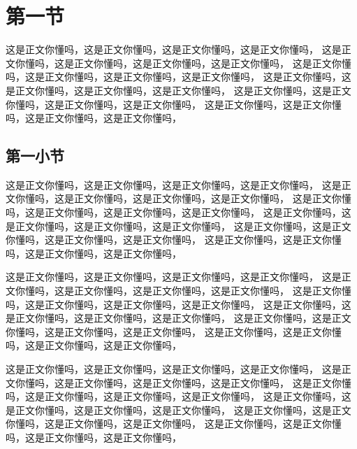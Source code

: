 \documentclass[11pt,a4paper]{article}
\begin{document}
\section{第一节}

这是正文你懂吗，这是正文你懂吗，这是正文你懂吗，这是正文你懂吗，
这是正文你懂吗，这是正文你懂吗，这是正文你懂吗，这是正文你懂吗，
这是正文你懂吗，这是正文你懂吗，这是正文你懂吗，这是正文你懂吗，
这是正文你懂吗，这是正文你懂吗，这是正文你懂吗，这是正文你懂吗，
这是正文你懂吗，这是正文你懂吗，这是正文你懂吗，这是正文你懂吗，
这是正文你懂吗，这是正文你懂吗，这是正文你懂吗，这是正文你懂吗，

\subsection{第一小节}

这是正文你懂吗，这是正文你懂吗，这是正文你懂吗，这是正文你懂吗，
这是正文你懂吗，这是正文你懂吗，这是正文你懂吗，这是正文你懂吗，
这是正文你懂吗，这是正文你懂吗，这是正文你懂吗，这是正文你懂吗，
这是正文你懂吗，这是正文你懂吗，这是正文你懂吗，这是正文你懂吗，
这是正文你懂吗，这是正文你懂吗，这是正文你懂吗，这是正文你懂吗，
这是正文你懂吗，这是正文你懂吗，这是正文你懂吗，这是正文你懂吗，

这是正文你懂吗，这是正文你懂吗，这是正文你懂吗，这是正文你懂吗，
这是正文你懂吗，这是正文你懂吗，这是正文你懂吗，这是正文你懂吗，
这是正文你懂吗，这是正文你懂吗，这是正文你懂吗，这是正文你懂吗，
这是正文你懂吗，这是正文你懂吗，这是正文你懂吗，这是正文你懂吗，
这是正文你懂吗，这是正文你懂吗，这是正文你懂吗，这是正文你懂吗，
这是正文你懂吗，这是正文你懂吗，这是正文你懂吗，这是正文你懂吗，

这是正文你懂吗，这是正文你懂吗，这是正文你懂吗，这是正文你懂吗，
这是正文你懂吗，这是正文你懂吗，这是正文你懂吗，这是正文你懂吗，
这是正文你懂吗，这是正文你懂吗，这是正文你懂吗，这是正文你懂吗，
这是正文你懂吗，这是正文你懂吗，这是正文你懂吗，这是正文你懂吗，
这是正文你懂吗，这是正文你懂吗，这是正文你懂吗，这是正文你懂吗，
这是正文你懂吗，这是正文你懂吗，这是正文你懂吗，这是正文你懂吗，

{}

\end{document}
